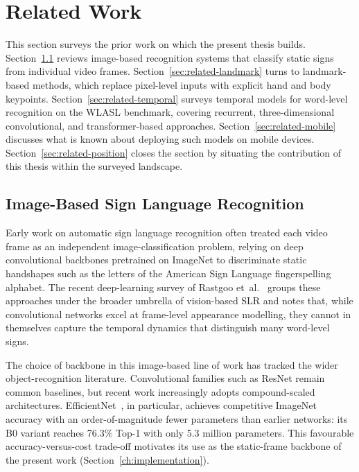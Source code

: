 \chapter{Related Work}
\label{ch:related-work}

This section surveys the prior work on which the present thesis builds.
Section~\ref{sec:related-image} reviews image-based recognition systems
that classify static signs from individual video frames.
Section~\ref{sec:related-landmark} turns to landmark-based methods, which
replace pixel-level inputs with explicit hand and body keypoints.
Section~\ref{sec:related-temporal} surveys temporal models for
word-level recognition on the WLASL benchmark, covering recurrent,
three-dimensional convolutional, and transformer-based approaches.
Section~\ref{sec:related-mobile} discusses what is known about deploying
such models on mobile devices. Section~\ref{sec:related-position} closes
the section by situating the contribution of this thesis within the
surveyed landscape.

\section{Image-Based Sign Language Recognition}
\label{sec:related-image}

Early work on automatic sign language recognition often treated each
video frame as an independent image-classification problem, relying on
deep convolutional backbones pretrained on ImageNet to discriminate
static handshapes such as the letters of the American Sign Language
fingerspelling alphabet. The recent deep-learning survey of Rastgoo
et~al.~\cite{rastgoo2021slr} groups these approaches under the broader
umbrella of vision-based SLR and notes that, while convolutional
networks excel at frame-level appearance modelling, they cannot in
themselves capture the temporal dynamics that distinguish many
word-level signs.

The choice of backbone in this image-based line of work has tracked the
wider object-recognition literature. Convolutional families such as
ResNet remain common baselines, but recent work increasingly adopts
compound-scaled architectures. EfficientNet~\cite{tan2019efficientnet},
in particular, achieves competitive ImageNet accuracy with an
order-of-magnitude fewer parameters than earlier networks: its B0
variant reaches 76.3\% Top-1 with only 5.3 million parameters. This
favourable accuracy-versus-cost trade-off motivates its use as the
static-frame backbone of the present work
(Section~\ref{ch:implementation}).

